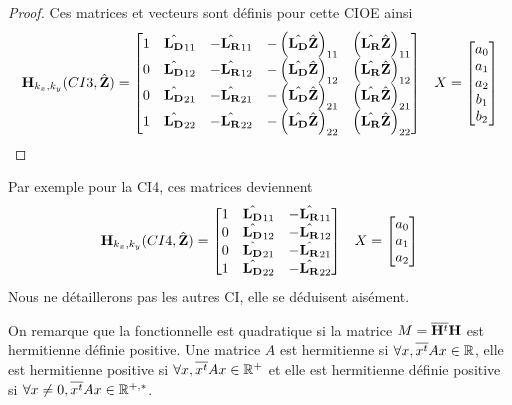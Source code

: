 \begin{proof}
  Ces matrices et vecteurs sont définis pour cette CIOE ainsi
    \begin{align}
        \mathbf{H}_{k_x,k_y}(CI3,\hat{\mathbf{Z}}) = \begin{bmatrix}
        1 & \hat{\mathbf{L_D}}_{11} & -\hat{\mathbf{L_R}}_{11} & -\left(\hat{\mathbf{L_D}}\hat{\mathbf{Z}}\right)_{11} & \left(\hat{\mathbf{L_R}}\hat{\mathbf{Z}}\right)_{11}
        \\
        0 & \hat{\mathbf{L_D}}_{12} & -\hat{\mathbf{L_R}}_{12} & -\left(\hat{\mathbf{L_D}}\hat{\mathbf{Z}}\right)_{12} & \left(\hat{\mathbf{L_R}}\hat{\mathbf{Z}}\right)_{12}
        \\
        0 & \hat{\mathbf{L_D}}_{21} & -\hat{\mathbf{L_R}}_{21} & -\left(\hat{\mathbf{L_D}}\hat{\mathbf{Z}}\right)_{21} & \left(\hat{\mathbf{L_R}}\hat{\mathbf{Z}}\right)_{21}
        \\
        1 & \hat{\mathbf{L_D}}_{22} & -\hat{\mathbf{L_R}}_{22} & -\left(\hat{\mathbf{L_D}}\hat{\mathbf{Z}}\right)_{22} & \left(\hat{\mathbf{L_R}}\hat{\mathbf{Z}}\right)_{22}
        \end{bmatrix}
        && X = \begin{bmatrix} a_0 \\ a_1 \\ a_2 \\ b_1 \\ b_2 \end{bmatrix}
    \end{align}
  \end{proof}

  Par exemple pour la CI4, ces matrices deviennent
  \begin{align}
      \mathbf{H}_{k_x,k_y}(CI4,\hat{\mathbf{Z}}) = \begin{bmatrix}
      1 & \hat{\mathbf{L_D}}_{11} & -\hat{\mathbf{L_R}}_{11}
      \\
      0 & \hat{\mathbf{L_D}}_{12} & -\hat{\mathbf{L_R}}_{12}
      \\
      0 & \hat{\mathbf{L_D}}_{21} & -\hat{\mathbf{L_R}}_{21}
      \\
      1 & \hat{\mathbf{L_D}}_{22} & -\hat{\mathbf{L_R}}_{22}
      \end{bmatrix}
      && X = \begin{bmatrix} a_0 \\ a_1 \\ a_2 \end{bmatrix}
  \end{align}
  Nous ne détaillerons pas les autres CI, elle se déduisent aisément.

  On remarque que la fonctionnelle est quadratique si la matrice \(M={\overline{\mathbf{H}^t}}{\mathbf{H}}\) est hermitienne définie positive. Une matrice \(A\) est hermitienne si \(\forall x, {\overline{x^t}}Ax \in \mathbb R\), elle est hermitienne positive si \(\forall x, {\overline{x^t}}Ax \in \mathbb R^+\) et elle est hermitienne définie positive si \(\forall x\not=0, {\overline{x^t}}Ax \in \mathbb R^{+,*}\).

